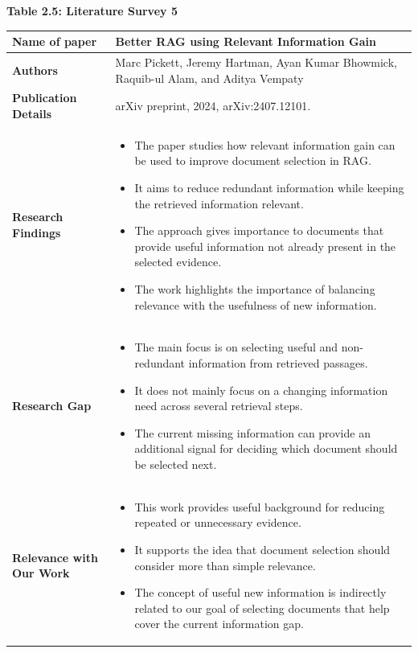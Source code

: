\documentclass[12pt,a4paper]{report}
\begin{document}
\begin{center}\textbf{Table 2.5: Literature Survey 5}\end{center}
\begin{longtable}{|p{1.25in}|p{5.15in}|}
\hline

\textbf{Name of paper} & Better RAG using Relevant Information Gain \cite{pickett2024better} \\ \hline

\textbf{Authors} & Marc Pickett, Jeremy Hartman, Ayan Kumar Bhowmick, Raquib-ul Alam, and Aditya Vempaty \\ \hline

\textbf{Publication Details} & arXiv preprint, 2024, arXiv:2407.12101. \\ \hline

\textbf{Research Findings} &
\begin{itemize}[leftmargin=0.18in,itemsep=0.05in,topsep=0pt,parsep=0pt]
\item The paper studies how relevant information gain can be used to improve document selection in RAG.
\item It aims to reduce redundant information while keeping the retrieved information relevant.
\item The approach gives importance to documents that provide useful information not already present in the selected evidence.
\item The work highlights the importance of balancing relevance with the usefulness of new information.
\end{itemize} \\ \hline

\textbf{Research Gap} &
\begin{itemize}[leftmargin=0.18in,itemsep=0.05in,topsep=0pt,parsep=0pt]
\item The main focus is on selecting useful and non-redundant information from retrieved passages.
\item It does not mainly focus on a changing information need across several retrieval steps.
\item The current missing information can provide an additional signal for deciding which document should be selected next.
\end{itemize} \\ \hline

\textbf{Relevance with Our Work} &
\begin{itemize}[leftmargin=0.18in,itemsep=0.05in,topsep=0pt,parsep=0pt]
\item This work provides useful background for reducing repeated or unnecessary evidence.
\item It supports the idea that document selection should consider more than simple relevance.
\item The concept of useful new information is indirectly related to our goal of selecting documents that help cover the current information gap.
\end{itemize} \\ \hline

\end{longtable}
\clearpage
\end{document}
